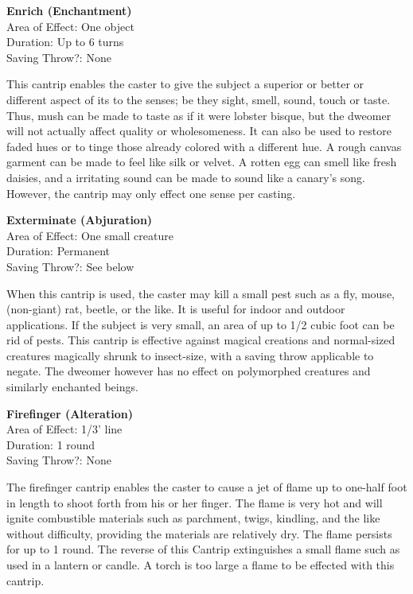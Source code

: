 \documentclass[letterpaper,sansserif,tightsqueeze]{rpg-module}
\begin{document}
\begin{samepage}	
\textbf{Enrich (Enchantment)}\\
Area of Effect: One object\\
Duration: Up to 6 turns\\
Saving Throw?: None

\nopagebreak
This cantrip enables the caster to give the subject a superior or better or different aspect of its to the senses; be they sight, smell, sound, touch or taste. Thus, mush can be made to taste as if it were lobster bisque, but the dweomer will not actually affect quality or wholesomeness. It can also be used to restore faded hues or to tinge those already colored with a different hue. A rough canvas garment can be made to feel like silk or velvet. A rotten egg can smell like fresh daisies, and a irritating sound can be made to sound like a canary’s song. However, the cantrip may only effect one sense per casting.
\end{samepage}

\begin{samepage}	
\textbf{Exterminate (Abjuration)}\\
Area of Effect: One small creature\\
Duration: Permanent\\
Saving Throw?: See below

\nopagebreak
When this cantrip is used, the caster may kill a small pest such as a fly, mouse, (non-giant) rat, beetle, or the like. It is useful for indoor and outdoor applications. If the subject is very small, an area of up to 1/2 cubic foot can be rid of pests. This cantrip is effective against magical creations and normal-sized creatures magically shrunk to insect-size, with a saving throw applicable to negate. The dweomer however has no effect on polymorphed creatures and similarly enchanted beings.
\end{samepage}

\begin{samepage}	
\textbf{Firefinger (Alteration)}\\
Area of Effect: 1/3' line\\
Duration: 1 round\\
Saving Throw?: None

\nopagebreak	
The firefinger cantrip enables the caster to cause a jet of flame up to one-half foot in length to shoot forth from his or her finger. The flame is very hot and will ignite combustible materials such as parchment, twigs, kindling, and the like without difficulty, providing the materials are relatively dry. The flame persists for up to 1 round.
The reverse of this Cantrip extinguishes a small flame such as used in a lantern or candle. A torch is too large a flame to be effected with this cantrip.
\end{samepage}
\end{document}
